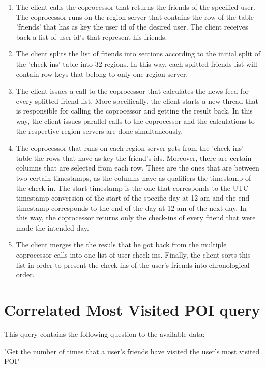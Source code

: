 \begin{enumerate}
 \item The client calls the coprocessor that returns the friends of the specified user. The coprocessor runs on the region server that contains 
 the row of the table 'friends' that has as key the user id of the desired user. The client receives back a list of user id's that 
 represent his friends.
 \item The client splits the list of friends into sections according to the initial split of the 'check-ins' table into 32 regions. In this way, 
 each splitted friends list will contain row keys that belong to only one region server.
 \item The client issues a call to the coprocessor that calculates the news feed for every splitted friend list. 
 More specifically, the client starts a new thread that is responsible for calling the coprocessor and getting the result back. 
 In this way, the client issues parallel calls to the coprocessor and the calculations to the respective region servers are done simultaneously.
 \item The coprocessor that runs on each region server gets from the 'check-ins' table the rows that have as key the friend's ids. Moreover, 
 there are certain columns that are selected from each row. These are the ones that are between two certain timestamps, as the columns have 
 as qualifiers the timestamp of the check-in. The start timestamp is the one that corresponds to the UTC timestamp conversion of the start of the 
 specific day at 12 am and the end timestamp corresponds to the end of the day at 12 am of the next day. In this way, the coprocessor returns 
 only the check-ins of every friend that were made the intended day.
 \item The client merges the the resuls that he got back from the multiple coprocessor calls into one list of user check-ins. Finally, 
 the client sorts this list in order to present the check-ins of the user's friends into chronological order.
\end{enumerate}

\section{Correlated Most Visited POI query}

This query contains the following question to the available data:
\begin{center}
 "Get the number of times that a user's friends have visited the user's most visited POI"
\end{center}


